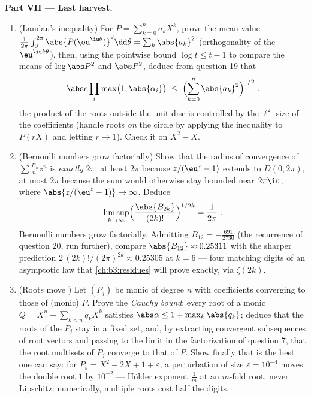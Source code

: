 \begin{problem}
\medskip
\noindent\textbf{Part VII --- Last harvest.}
\begin{enumerate}[resume]
  \item (Landau's inequality) For $P = \sum_{k=0}^na_kX^k$,
        prove the mean value $\frac1{2\pi}\int_0^{2\pi}
        \abs{P(\eu^{\iu\theta})}^2\dd\theta =
        \sum_k\abs{a_k}^2$ (orthogonality of the
        $\eu^{\iu k\theta}$), then, using the pointwise bound
        $\log t \leq t - 1$ to compare the means of
        $\log\abs P^2$ and $\abs P^2$, deduce from question
        19 that
        \[
        \abs c\prod_{i}\max\bigl(1, \abs{\alpha_i}\bigr)
        \;\leq\;
        \Bigl(\sum_{k=0}^{n}\abs{a_k}^2\Bigr)^{1/2} :
        \]
        the product of the roots outside the unit disc is
        controlled by the $\ell^2$ size of the coefficients
        (handle roots \emph{on} the circle by applying the
        inequality to $P(rX)$ and letting $r \to 1$). Check
        it on $X^2 - X$.
  \item (Bernoulli numbers grow factorially) Show that the
        radius of convergence of $\sum\frac{B_n}{n!}z^n$ is
        \emph{exactly} $2\pi$: at least $2\pi$ because
        $z/(\eu^z - 1)$ extends  to
        $D(0, 2\pi)$, at most $2\pi$ because the sum would
        otherwise stay bounded near $2\pi\iu$, where
        $\abs{z/(\eu^z-1)} \to \infty$. Deduce
        \[
        \limsup_{k\to\infty}
        \Bigl(\frac{\abs{B_{2k}}}{(2k)!}\Bigr)^{1/2k}
        = \frac1{2\pi} :
        \]
        Bernoulli numbers grow factorially. Admitting $B_{12}
        = -\frac{691}{2730}$ (the recurrence of question 20,
        run further), compare $\abs{B_{12}} \approx 0.25311$
        with the sharper prediction $2\,(2k)!/(2\pi)^{2k}
        \approx 0.25305$ at $k = 6$ --- four matching digits
        of an asymptotic law that \cref{ch:b3:residues} will
        prove exactly, via $\zeta(2k)$.
  \item (Roots move ) Let $(P_j)$ be monic of
        degree $n$ with coefficients converging to those of
        (monic) $P$. Prove the \emph{Cauchy bound}: every
        root of a monic $Q = X^n + \sum_{k<n}q_kX^k$
        satisfies $\abs\alpha \leq 1 + \max_k\abs{q_k}$;
        deduce that the roots of the $P_j$ stay in a fixed
         set, and, by extracting convergent
        subsequences of root vectors and passing to the
        limit in the factorization of question 7, that the
        root multisets of $P_j$ converge to that of $P$.
        Show finally that  is the best one can
        say: for $P_\varepsilon = X^2 - 2X + 1 +
        \varepsilon$, a perturbation of size $\varepsilon =
        10^{-4}$ moves the double root $1$ by $10^{-2}$ ---
        H\"older exponent $\frac1m$ at an $m$-fold root,
        never Lipschitz: numerically, multiple roots cost
        half the digits.
\end{enumerate}
\end{problem}
